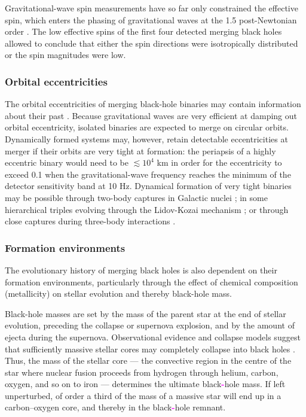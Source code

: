 \documentclass[review]{elsarticle}
\newcommand{\ilya}[1]{\textcolor{magenta}{\bf{#1}}}
\begin{document}
Gravitational-wave spin measurements have so far only constrained the effective spin, which enters the phasing of gravitational waves at the 1.5 post-Newtonian order \citep{PoissonWill:1995}.  The low effective spins of the first four detected merging black holes allowed \citet{Farr:2017} to conclude that either the spin directions were isotropically distributed or the spin magnitudes were low.

\subsubsection{Orbital eccentricities}
	The orbital eccentricities of merging black-hole binaries may contain information about their past \citep{MandelOShaughnessy:2010}. Because gravitational waves are very efficient at damping out orbital eccentricity, isolated binaries are expected to merge on circular orbits. Dynamically formed systems may, however, retain detectable eccentricities at merger if their orbits are very tight at formation: the periapsis of a highly eccentric binary would need to be $\lesssim 10^4$ km in order for the eccentricity to exceed 0.1 when the gravitational-wave frequency reaches the minimum of the detector sensitivity band at 10 Hz.  Dynamical formation of very tight binaries may be possible through two-body captures in Galactic nuclei \citep{OLeary:2008} \citep[but see][]{Tsang:2013}; in some hierarchical triples evolving through the Lidov-Kozai mechanism \citep[e.g.,][]{AntoniniPerets:2012}; or through close captures during three-body interactions \citep{Samsing:2014, Rodriguez:2018}. 


\subsubsection{Formation environments}
\label{environ}
The evolutionary history of merging black holes is also dependent on their formation environments, particularly through the effect of chemical composition (metallicity) on stellar evolution and thereby black-hole mass.

Black-hole masses are set by the mass of the parent star at the end of stellar evolution, preceding the collapse or supernova explosion, and by the amount of ejecta during the supernova. Observational evidence and collapse models suggest that sufficiently massive stellar cores may completely collapse into black holes \citep[for a review, see][]{Mirabel:2016}. Thus, the mass of the stellar core --- the convective region in the centre of the star where nuclear fusion proceeds from hydrogen through helium, carbon, oxygen, and so on to iron --- determines the ultimate black\ilya{-}hole mass.  If left unperturbed, of order a third of the mass of a massive star will end up in a carbon--oxygen core, and thereby in the black\ilya{-}hole remnant.
\end{document}
